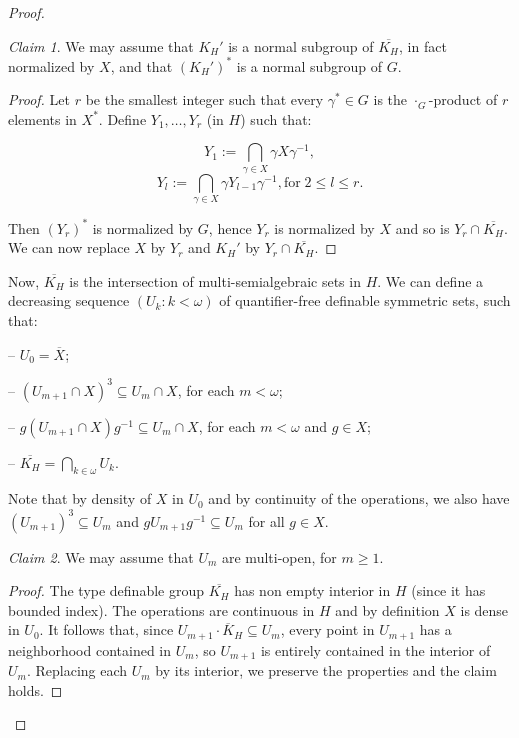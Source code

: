\documentclass[12pt]{article}
\theoremstyle{definition}
\theoremstyle{mystyle}
\theoremstyle{remark}
\newtheorem*{claim}{Claim}
\newenvironment{claimproof}
    {\begin{proof}}{\renewcommand\qedsymbol{\Squarepipe} \end{proof}}
\def\OK{\overline{K}}
\begin{document}
\begin{proof}
\begin{claim}
We may assume that $K_H'$ is a normal subgroup of $\overline{K_H}$, in fact normalized by $X$, and that $(K_H')^*$ is a normal subgroup of $G$.
\end{claim}

\begin{claimproof}
Let $r$ be the smallest integer such that every $\gamma^* \in G$ is the $\cdot_G$-product of $r$ elements in $X^*$.
Define $Y_1, \ldots, Y_r$ (in $H$) such that:

\[Y_1:= \bigcap_{\gamma \in X} \gamma X {\gamma^{-1}},\]
\[Y_l:= \bigcap_{\gamma \in X} \gamma Y_{l-1} \gamma^{-1}, \mbox{for}  \; 2 \leq l \leq r.\]

Then $(Y_r)^*$ is normalized by $G$, hence $Y_r$ is normalized by $X$ and so is $Y_r \cap \overline{K_H}$. We can now replace $X$ by $Y_r$ and $K_H'$ by $Y_r \cap \overline{K_H}$.
\end{claimproof}


Now, $\overline{K_H}$ is the intersection of multi-semialgebraic
sets in $H$. We can define a decreasing sequence $(U_k:k<\omega)$
of quantifier-free definable symmetric sets, such that:

-- $U_0=\overline{X}$;

-- $({U_{m+1}\cap X})^3\subseteq {U_{m}\cap X}$, for each $m<\omega$;

-- $g({U_{m+1}\cap X})g^{-1} \subseteq U_m
\cap X$, for each $m<\omega$ and $g\in X$;

-- $\overline{K_H}=\bigcap_{k \in \omega} U_k$.

Note that by density of $X$ in $U_0$ and by continuity of the operations, we also have $({U_{m+1}})^3
\subseteq {U_{m}}$ and $g{U_{m+1}}g^{-1} \subseteq U_m$ for all $g\in X$.


\begin{claim}
We may assume that $U_m$ are multi-open, for $m\geq 1$.
\end{claim}

\begin{claimproof}
The type definable group $\overline{K_H}$ has non empty interior in $H$ (since it has bounded index). The operations are continuous in $H$ and by definition $X$
is dense in $U_0$. It follows that, since $U_{m+1}\cdot
\OK_H\subseteq U_{m}$, every point in $U_{m+1}$ has a neighborhood
contained in $U_m$, so $U_{m+1}$ is entirely contained in the
interior of $U_m$. Replacing each $U_m$ by its interior, we preserve the properties and the claim holds.
\end{claimproof}


\end{proof}
\end{document}
